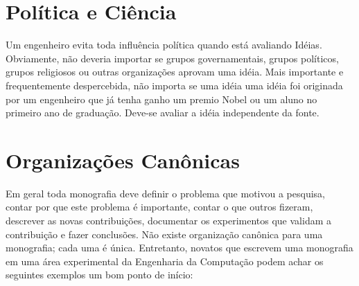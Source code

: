 \section{Política e Ciência}

Um engenheiro evita toda influência política quando está avaliando Idéias. Obviamente, não deveria importar se grupos governamentais, grupos políticos, grupos religiosos ou outras organizações aprovam uma idéia.
Mais importante e frequentemente despercebida, não importa se uma idéia uma idéia foi originada por um engenheiro que já tenha ganho um premio Nobel ou um aluno no primeiro ano de graduação. Deve-se avaliar a idéia independente da fonte.

\section{Organizações Canônicas}
 	
Em geral toda monografia deve definir o problema que motivou a pesquisa, contar por que este problema é importante, contar o que outros fizeram, descrever as novas contribuições, documentar os experimentos que validam a contribuição e fazer conclusões.
Não existe organização canônica para uma monografia; cada uma é única. Entretanto, novatos que escrevem uma monografia em uma área experimental da Engenharia da Computação podem achar os seguintes exemplos um bom ponto de início: 

